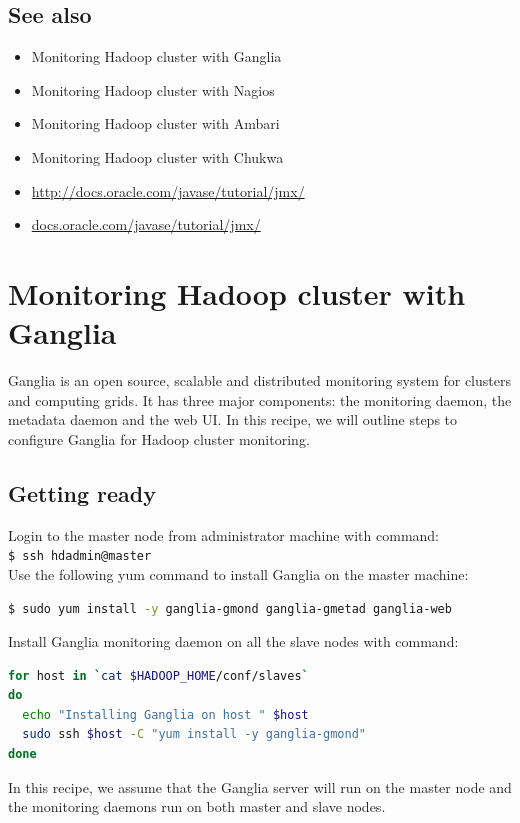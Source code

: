 \subsection*{See also}
\begin{itemize}
  \item Monitoring Hadoop cluster with Ganglia
  \item Monitoring Hadoop cluster with Nagios
  \item Monitoring Hadoop cluster with Ambari
  \item Monitoring Hadoop cluster with Chukwa
  \item \url{http://docs.oracle.com/javase/tutorial/jmx/}
  \item \url{docs.oracle.com/javase/tutorial/jmx/}
\end{itemize}

\section{Monitoring Hadoop cluster with Ganglia}
Ganglia is an open source, scalable and distributed monitoring system for clusters and computing grids. It has three major components: the monitoring daemon, the metadata daemon and the web UI. In this recipe, we will outline steps to configure Ganglia for Hadoop cluster monitoring.
\subsection*{Getting ready}
Login to the master node from administrator machine with command: \\
\verb|$ ssh hdadmin@master| \\

Use the following yum command to install Ganglia on the master machine: 
\lstset{style=bashstyle}
\begin{lstlisting}[language=bash]
$ sudo yum install -y ganglia-gmond ganglia-gmetad ganglia-web
\end{lstlisting}

Install Ganglia monitoring daemon on all the slave nodes with command:
\lstset{style=bashstyle}
\begin{lstlisting}[language=bash]
for host in `cat $HADOOP_HOME/conf/slaves`
do
  echo "Installing Ganglia on host " $host
  sudo ssh $host -C "yum install -y ganglia-gmond"
done
\end{lstlisting}

In this recipe, we assume that the Ganglia server will run on the master node and the monitoring daemons run on both master and slave nodes.
